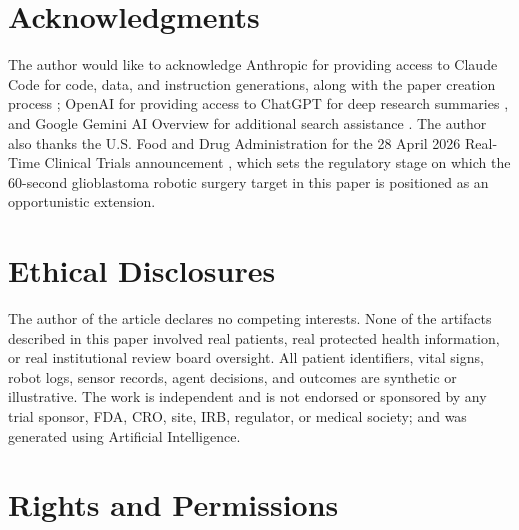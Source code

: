 
{}
\section*{Acknowledgments}
\label{sec:acknowledgments}

The author would like to acknowledge Anthropic for providing access to
Claude Code for code, data, and instruction generations, along with the
paper creation process \cite{claude-code, claude-opus-47,
claude-sonnet-46}; OpenAI for providing access to ChatGPT for deep
research summaries \cite{chatgpt-thinking}, and Google Gemini AI
Overview for additional search assistance \cite{google-gemini-overview}.
The author also thanks the U.S. Food and Drug Administration for the
28 April 2026 Real-Time Clinical Trials announcement
\cite{fda2026realtime}, which sets the regulatory stage on which the
60-second glioblastoma robotic surgery target in this paper is
positioned as an opportunistic extension.

{}
\section*{Ethical Disclosures}
\label{sec:ethics}

The author of the article declares no competing interests. None of
the artifacts described in this paper involved real patients, real
protected health information, or real institutional review board
oversight. All patient identifiers, vital signs, robot logs, sensor
records, agent decisions, and outcomes are synthetic or illustrative.
The work is independent and is not endorsed or sponsored by any trial
sponsor, FDA, CRO, site, IRB, regulator, or medical society; and was
generated using Artificial Intelligence.

{}
\section*{Rights and Permissions}
\label{sec:rights}

